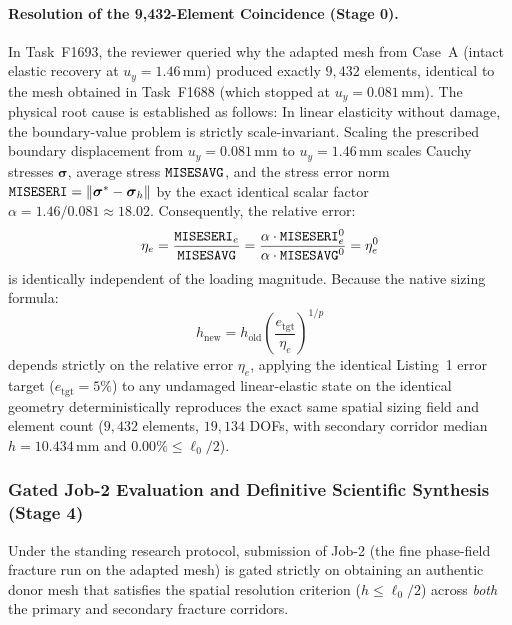 \paragraph{Resolution of the 9,432-Element Coincidence (Stage 0).}
In Task~F1693, the reviewer queried why the adapted mesh from Case~A (intact elastic recovery at $u_y = 1.46\,\mathrm{mm}$) produced exactly $9{,}432$ elements, identical to the mesh obtained in Task~F1688 (which stopped at $u_y = 0.081\,\mathrm{mm}$). The physical root cause is established as follows:
In linear elasticity without damage, the boundary-value problem is strictly scale-invariant. Scaling the prescribed boundary displacement from $u_y = 0.081\,\mathrm{mm}$ to $u_y = 1.46\,\mathrm{mm}$ scales Cauchy stresses $\boldsymbol{\sigma}$, average stress $\texttt{MISESAVG}$, and the stress error norm $\texttt{MISESERI} = \|\boldsymbol{\sigma}^* - \boldsymbol{\sigma}_h\|$ by the exact identical scalar factor $\alpha = 1.46 / 0.081 \approx 18.02$. Consequently, the relative error:
\begin{equation}
  \eta_e = \frac{\texttt{MISESERI}_e}{\texttt{MISESAVG}} = \frac{\alpha \cdot \texttt{MISESERI}_e^0}{\alpha \cdot \texttt{MISESAVG}^0} = \eta_e^0
\end{equation}
is identically independent of the loading magnitude. Because the native \Abaqus sizing formula:
\begin{equation}
  h_{\mathrm{new}} = h_{\mathrm{old}} \left( \frac{e_{\mathrm{tgt}}}{\eta_e} \right)^{1/p}
\end{equation}
depends strictly on the relative error $\eta_e$, applying the identical Listing~1 error target ($e_{\mathrm{tgt}} = 5\%$) to any undamaged linear-elastic state on the identical geometry deterministically reproduces the exact same spatial sizing field and element count ($9{,}432$ elements, $19{,}134$ DOFs, with secondary corridor median $h = 10.434\,\mathrm{mm}$ and $0.00\% \le \ell_0/2$).

\subsubsection{Gated Job-2 Evaluation and Definitive Scientific Synthesis (Stage 4)}
Under the standing research protocol, submission of Job-2 (the fine phase-field fracture run on the adapted mesh) is gated strictly on obtaining an authentic donor mesh that satisfies the spatial resolution criterion ($h \le \ell_0/2$) across \emph{both} the primary and secondary fracture corridors. 

